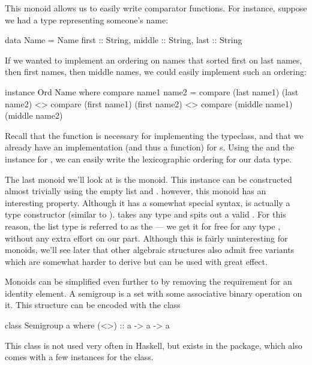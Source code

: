 This monoid allows us to easily write comparator functions. For instance, suppose we had a type
representing someone's name:
\begin{haskell}
data Name = Name {
    first :: String,
    middle :: String,
    last :: String
  }
\end{haskell}

If we wanted to implement an ordering on names that sorted first on last names, then first names,
then middle names, we could easily implement such an ordering:
\begin{haskell}
instance Ord Name where
  compare name1 name2 =
    compare (last name1) (last name2) <>
    compare (first name1) (first name2) <>
    compare (middle name1) (middle name2)
\end{haskell}
Recall that the function  is necessary for implementing the
 typeclass, and that we already have an  implementation (and thus a
 function) for s.  Using the   and the
 instance for , we can easily write the lexicographic ordering for
our  data type.

The last monoid we'll look at is the \inline{[a]} monoid.  This instance can be constructed almost
trivially using the empty list and \inline{++}.  however, this monoid has an interesting property.
Although it has a somewhat special syntax, \inline{[]} is actually a type constructor (similar to
). \inline{[]} takes any type  and spits out a valid . For
this reason, the list type \inline{[a]} is referred to as the  --- we get it
for free for any type , without any extra effort on our part. Although this is fairly
uninteresting for monoids, we'll see later that other algebraic structures also admit free variants
which are somewhat harder to derive but can be used with great effect.

\begin{tangent}[frametitle=Semigroups]
Monoids can be simplified even further to  by removing the requirement for an
identity element. A semigroup is a set with some associative binary operation on it. This structure
can be encoded with the class
\begin{haskell}
class Semigroup a where
  (<>) :: a -> a -> a
\end{haskell}

This class is not used very often in Haskell, but exists in the  package, which
also comes with a few instances for the class.
\end{tangent}

